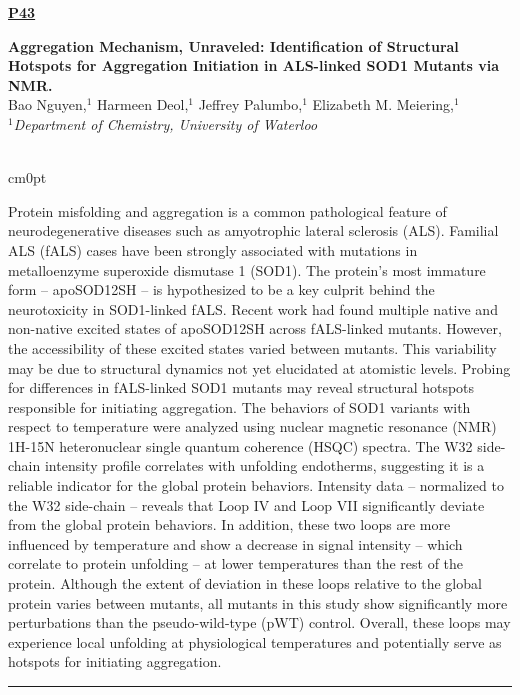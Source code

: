 \documentclass[titlepage,oneside,openany,10pt]{book}
\newenvironment{posterabswfig}[7] %
        {
	\FPeval{\cutw}{clip(16.7-#6)}
	\FPeval{\cutl}{round(#7/0.35+1,3)}
	\begin{flushright}
                \underline{\textbf{#4}}
        \end{flushright}
        \textbf{#1}\\%
        #2\\%
        \textit{#3}\\\\%
        \def\windowpagestuff{\centering
                \texttt{[image: \#5]}
	}
        \opencutright
        \begin{cutout}{0}{\cutw cm}{0pt}{\RoundingUpFunction{\cutl}}
        \noindent
	}
	{
	\end{cutout}
	\noindent\rule{15cm}{0.5pt}%
        }
\begin{document}
\begin{posterabswfig}
    {Aggregation Mechanism, Unraveled: Identification of Structural Hotspots for Aggregation Initiation in ALS-linked SOD1 Mutants via NMR.}
    {Bao Nguyen,$^{1}$ Harmeen Deol,$^{1}$ Jeffrey Palumbo,$^{1}$ Elizabeth M. Meiering,$^{1}$}
    {
    $^1$Department of Chemistry, University of Waterloo
    }
    {P43}
    {abstract_figures/Nguyen_Bao_Poster.png}
    {10.0}
    {4.0}
    Protein misfolding and aggregation is a common pathological feature of neurodegenerative diseases such as amyotrophic lateral sclerosis (ALS). Familial ALS (fALS) cases have been strongly associated with mutations in metalloenzyme superoxide dismutase 1 (SOD1). The protein's most immature form -- apoSOD12SH -- is hypothesized to be a key culprit behind the neurotoxicity in SOD1-linked fALS. Recent work had found multiple native and non-native excited states of apoSOD12SH across fALS-linked mutants. However, the accessibility of these excited states varied between mutants. This variability may be due to structural dynamics not yet elucidated at atomistic levels. Probing for differences in fALS-linked SOD1 mutants may reveal structural hotspots responsible for initiating aggregation. The behaviors of SOD1 variants with respect to temperature were analyzed using nuclear magnetic resonance (NMR) 1H-15N heteronuclear single quantum coherence (HSQC) spectra. The W32 side-chain intensity profile correlates with unfolding endotherms, suggesting it is a reliable indicator for the global protein behaviors. Intensity data -- normalized to the W32 side-chain -- reveals that Loop IV and Loop VII significantly deviate from the global protein behaviors. In addition, these two loops are more influenced by temperature and show a decrease in signal intensity -- which correlate to protein unfolding -- at lower temperatures than the rest of the protein. Although the extent of deviation in these loops relative to the global protein varies between mutants, all mutants in this study show significantly more perturbations than the pseudo-wild-type (pWT) control. Overall, these loops may experience local unfolding at physiological temperatures and potentially serve as hotspots for initiating aggregation.
    \label{NguyenB}
\end{posterabswfig}
\end{document}
